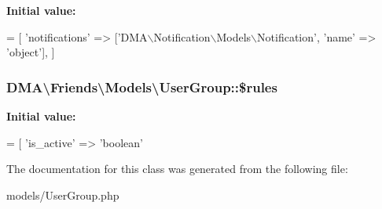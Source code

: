 {\bfseries Initial value\-:}
\begin{DoxyCode}
= [
        \textcolor{stringliteral}{'notifications'}  => [\textcolor{stringliteral}{'DMA\(\backslash\)Notification\(\backslash\)Models\(\backslash\)Notification'}, \textcolor{stringliteral}{'name'} => \textcolor{stringliteral}{'object'}],
    ]
\end{DoxyCode}
\hypertarget{classDMA_1_1Friends_1_1Models_1_1UserGroup_afe3638379efd008d908f38c86b434c76}{
\subsubsection[{\$rules}]{\setlength{\rightskip}{0pt plus 5cm}D\-M\-A\textbackslash{}\-Friends\textbackslash{}\-Models\textbackslash{}\-User\-Group\-::\$rules}}\label{classDMA_1_1Friends_1_1Models_1_1UserGroup_afe3638379efd008d908f38c86b434c76}
{\bfseries Initial value\-:}
\begin{DoxyCode}
= [
        \textcolor{stringliteral}{'is\_active'} => \textcolor{stringliteral}{'boolean'}
\end{DoxyCode}


The documentation for this class was generated from the following file\-:\begin{DoxyCompactItemize}
\item 
models/User\-Group.\-php\end{DoxyCompactItemize}
